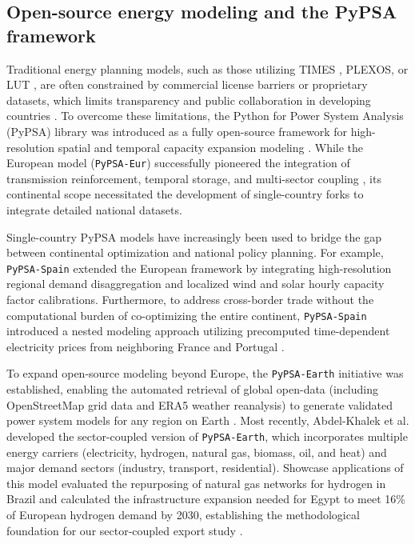 \documentclass[preprint,12pt]{elsarticle}
\begin{document}
\subsection{Open-source energy modeling and the PyPSA framework}
Traditional energy planning models, such as those utilizing TIMES \cite{fattahi2024opportunities}, PLEXOS, or LUT \cite{abdelkhalek2025pypsa}, are often constrained by commercial license barriers or proprietary datasets, which limits transparency and public collaboration in developing countries \cite{abdelkhalek2025pypsa, gallego2025pypsaspain}. To overcome these limitations, the Python for Power System Analysis (PyPSA) library was introduced as a fully open-source framework for high-resolution spatial and temporal capacity expansion modeling \cite{gallego2025pypsaspain}. While the European model (\texttt{PyPSA-Eur}) successfully pioneered the integration of transmission reinforcement, temporal storage, and multi-sector coupling \cite{gallego2025pypsaspain}, its continental scope necessitated the development of single-country forks to integrate detailed national datasets.

Single-country PyPSA models have increasingly been used to bridge the gap between continental optimization and national policy planning. For example, \texttt{PyPSA-Spain} \cite{gallego2025pypsaspain} extended the European framework by integrating high-resolution regional demand disaggregation and localized wind and solar hourly capacity factor calibrations. Furthermore, to address cross-border trade without the computational burden of co-optimizing the entire continent, \texttt{PyPSA-Spain} introduced a nested modeling approach utilizing precomputed time-dependent electricity prices from neighboring France and Portugal \cite{gallego2025pypsaspain}. 

To expand open-source modeling beyond Europe, the \texttt{PyPSA-Earth} initiative was established, enabling the automated retrieval of global open-data (including OpenStreetMap grid data and ERA5 weather reanalysis) to generate validated power system models for any region on Earth \cite{abdelkhalek2025pypsa}. Most recently, Abdel-Khalek et al. \cite{abdelkhalek2025pypsa} developed the sector-coupled version of \texttt{PyPSA-Earth}, which incorporates multiple energy carriers (electricity, hydrogen, natural gas, biomass, oil, and heat) and major demand sectors (industry, transport, residential). Showcase applications of this model evaluated the repurposing of natural gas networks for hydrogen in Brazil and calculated the infrastructure expansion needed for Egypt to meet 16\% of European hydrogen demand by 2030, establishing the methodological foundation for our sector-coupled export study \cite{abdelkhalek2025pypsa}.
\end{document}
